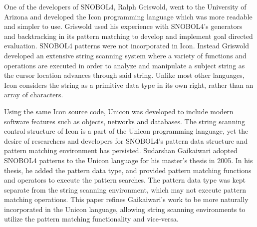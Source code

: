 \documentclass{article}
\begin{document}
One of the developers of SNOBOL4, Ralph Griswold, went to the University of Arizona and developed the Icon programming language which was more readable and simpler to use\cite{JefferyUnicon}.  Griswold used his experience with SNOBOL4's generators and backtracking in its pattern matching to develop and implement goal directed evaluation\cite{Gaikaiwari2005}.  SNOBOL4 patterns were not incorporated in Icon.  Instead Griswold developed an extensive string scanning system where a variety of functions and operations are executed in order to analyze and manipulate a subject string as the cursor location advances through said string.  Unlike most other languages, Icon considers the string as a primitive data type in its own right, rather than an array of characters\cite{GriswoldIcon}.  

Using the same Icon source code, Unicon was developed to include modern software features such as objects, networks and databases\cite{JefferyUnicon}.  The string scanning control structure of Icon is a part of the Unicon programming language, yet the desire of researchers and developers for SNOBOL4's pattern data structure and pattern matching environment has persisted.  Sudarshan Gaikaiwari adopted SNOBOL4 patterns to the Unicon language for his master's thesis in 2005.  In his thesis, he added the pattern data type, and provided pattern matching functions and operators to execute the pattern searches\cite{Gaikaiwari2005}.  The pattern data type was kept separate from the string scanning environment, which may not execute pattern matching operations.  This paper refines Gaikaiwari's work to be more naturally incorporated in the Unicon language, allowing string scanning environments to utilize the pattern matching functionality and vice-versa.


\end{document}
